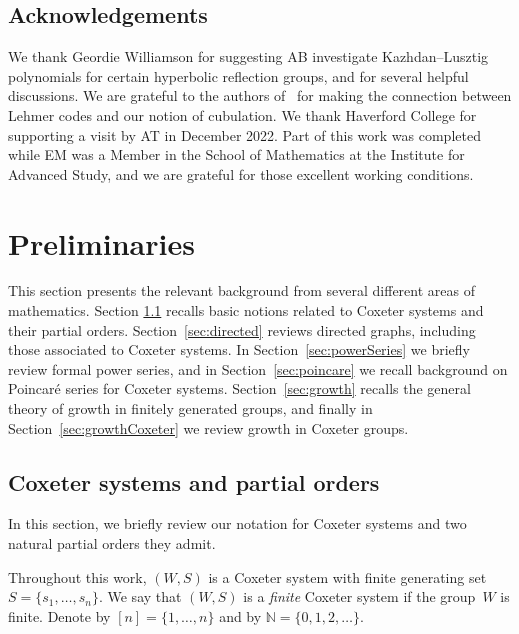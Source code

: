 \documentclass[11pt]{amsart}
\theoremstyle{plain}
\theoremstyle{definition}
\newcommand{\N}{\mathbb{N}}
\numberwithin{equation}{subsection}
\begin{document}
\subsection{Acknowledgements}

We thank Geordie Williamson for suggesting AB investigate Kazhdan--Lusztig polynomials for certain hyperbolic reflection groups, and for several helpful discussions.  We are grateful to the authors of~\cite{Bolognini2025,SentinelliZatti,GaetzGao} for making the connection between Lehmer codes and our notion of cubulation. We thank Haverford College for supporting a visit by AT in December 2022. Part of this work was completed while EM was a Member in the School of Mathematics at the Institute for Advanced Study, and we are grateful for those excellent working conditions.




\section{Preliminaries}\label{sec:preliminaries}


This section presents the relevant background from several different areas of mathematics.
Section \ref{sec:CoxeterBruhat} recalls basic notions related to Coxeter systems and their partial orders. Section~\ref{sec:directed} reviews directed graphs, including those associated to Coxeter systems. In Section~\ref{sec:powerSeries} we briefly review formal power series, and in Section~\ref{sec:poincare} we recall background on Poincar\'e series for Coxeter systems. Section~\ref{sec:growth} recalls the general theory of growth in finitely generated groups, and finally in Section~\ref{sec:growthCoxeter} we review growth in Coxeter groups. 

\subsection{Coxeter systems and partial orders}\label{sec:CoxeterBruhat}

In this section, we briefly review our notation for Coxeter systems and two natural partial orders they admit.

Throughout this work, $(W,S)$ is a Coxeter system with finite generating set $S = \{ s_1, \dots, s_n\}$. We say that $(W,S)$ is a \emph{finite} Coxeter system if the group~$W$ is finite. Denote by $[n] = \{1,\dots,n\}$ and by $\N = \{0, 1, 2, \dots \}$. %
\end{document}
